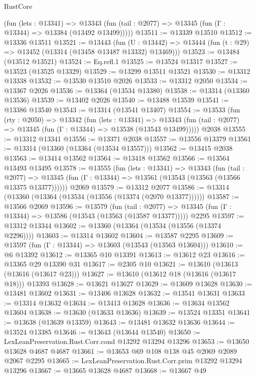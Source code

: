 \begin{lexlean}{RustCore}
\begin{coremodule}
      (fun (lets : @13341) =>
      @13343 (fun (tail : @2077) => @13345 (fun (Γ : @13344) => @13384 (@13492 @13499)))))
@13511 := @13339 @13510
@13512 := @13336 @13511
@13521 := @13443
    (fun (U : @13442) => @13444 (fun (t : @29) => @13452 (@13314 (@13458 @13487 @13332) @13469)))
@13523 := @13484 (@13512 @13521)
@13524 := Eq.refl.{1}
@13525 := @13524 @13317
@13527 := @13523 (@13525 @13329)
@13529 := @13299 @13511 @13521
@13530 := @13312 @13338
@13532 := @13530 @13510 @2026
@13533 := @13312 @2050
@13534 := @13367 @2026
@13536 := @13364 (@13534 @13380)
@13538 := @13314 (@13360 @13536)
@13539 := @13402 @2026
@13540 := @13488 @13539
@13541 := @13386 @13540
@13543 := @13314 (@13541 @13407)
@13554 := @13533
    (fun (rty : @2050) =>
    @13342
      (fun (lets : @13341) =>
      @13343 (fun (tail : @2077) => @13345 (fun (Γ : @13344) => @13538 (@13543 @13499)))))
    @2038
@13555 := @13312 @13341
@13556 := @13371 @2038
@13557 := @13556 @13379
@13561 := @13314 (@13360 (@13364 (@13534 @13557)))
@13562 := @13415 @2038
@13563 := @13414 @13562
@13564 := @13418 @13562
@13566 := @13564 @13493 @13495
@13578 := @13555
    (fun (lets : @13341) =>
    @13343
      (fun (tail : @2077) =>
      @13345 (fun (Γ : @13344) => @13561 (@13543 (@13563 (@13566 @13375 @13377))))))
    @2069
@13579 := @13312 @2077
@13586 := @13314 (@13360 (@13364 (@13534 (@13556 (@13374 (@2070 @13377))))))
@13587 := @13566 @2069
@13596 := @13579
    (fun (tail : @2077) => @13345 (fun (Γ : @13344) => @13586 (@13543 (@13563 (@13587 @13377)))))
    @2295
@13597 := @13312 @13344
@13602 := @13360 (@13364 (@13534 (@13556 (@13374 @2296))))
@13603 := @13314 @13602
@13604 := @13587 @2295
@13609 := @13597 (fun (Γ : @13344) => @13603 (@13543 (@13563 @13604)))
@13610 := @6 @13392
@13612 := @13365 @10 @13391
@13613 := @13612 @23
@13616 := @13365 @29 @13390 @31
@13617 := @2305 @10
@13621 := @13610 (@13613 (@13616 (@13617 @23)))
@13627 := @13610 (@13612 @18 (@13616 (@13617 @18))) @13393
@13628 := @13621 @13627
@13629 := @13609 @13628
@13630 := @13481 @13602
@13631 := @13406 @13628
@13632 := @13541 @13631
@13633 := @13314 @13632
@13634 := @13413 @13628
@13636 := @13634 @13562 @13604
@13638 := @13630 (@13633 @13636)
@13639 := @13524 @13351
@13641 := @13638 (@13639 @13359)
@13643 := @13481 @13632 @13636
@13644 := @13524 @13385
@13646 := @13643 (@13644 @13540)
@13650 := LexLeanPreservation.Rust.Corr.cond @13292 @13294 @13296
@13653 := @13650 @13628 @4687 @4687
@13661 := @13653 @69 @108 @138 @45 @2069 @2089 @2067 @2295
@13665 := LexLeanPreservation.Rust.Corr.prim @13292 @13294 @13296
@13667 := @13665 @13628 @4687
@13668 := @13667 @49

\end{coremodule}
\end{lexlean}
